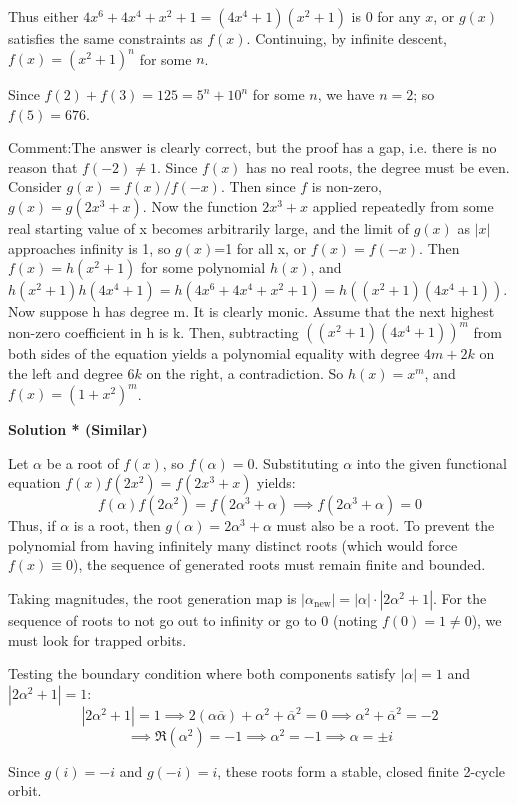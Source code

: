 \begin{enumerate}
 Thus either $4x^6+4x^4+x^2+1=(4x^4+1)(x^2+1)$ is 0 for any $x$, or $g(x)$ satisfies the same constraints as $f(x)$. Continuing, by infinite descent, $f(x) = (x^2 + 1)^n$ for some $n$.

 Since $f(2)+f(3)=125=5^n+10^n$ for some $n$, we have $n=2$; so $f(5) = \boxed{676}$.

 
Comment:The answer is clearly correct, but the proof has a gap, i.e. there is no reason that $f(-2)\neq1$.  Since $f(x)$ has no real roots, the degree must be even.  Consider $g(x)= f(x)/f(-x)$.  Then since $f$ is non-zero, $g(x)=g(2x^3+x)$. Now the function $2x^3+x$ applied repeatedly from some real starting value of x becomes arbitrarily large, and the limit of $g(x)$ as $|x|$ approaches infinity is 1, so $g(x)$=1 for all x, or $f(x)=f(-x)$.  Then $f(x)=h(x^2+1)$ for some polynomial $h(x)$, and $h(x^2+1)h(4x^4+1)=h(4x^6+4x^4+x^2+1) = h((x^2+1)(4x^4+1))$.  Now suppose h has degree m.  It is clearly monic.  Assume that the next highest non-zero coefficient in h is k.  Then, subtracting $((x^2+1)(4x^4+1))^m$ from both sides of the equation yields a polynomial equality with degree $4m+2k$ on the left and degree $6k$ on the right, a contradiction.  So $h(x)=x^m$, and $f(x)=(1+x^2)^m$.

 



\textbf{Solution * (Similar)}

Let $\alpha$ be a root of $f(x)$, so $f(\alpha) = 0$. Substituting $\alpha$ into the given functional equation $f(x)f(2x^2) = f(2x^3+x)$ yields:
 \[f(\alpha)f(2\alpha^2) = f(2\alpha^3+\alpha) \implies f(2\alpha^3+\alpha) = 0\]Thus, if $\alpha$ is a root, then $g(\alpha) = 2\alpha^3+\alpha$ must also be a root. To prevent the polynomial from having infinitely many distinct roots (which would force $f(x) \equiv 0$), the sequence of generated roots must remain finite and bounded.

 Taking magnitudes, the root generation map is $|\alpha_{\text{new}}| = |\alpha| \cdot |2\alpha^2 + 1|$. For the sequence of roots to not go out to infinity or go to $0$ (noting $f(0)=1 \neq 0$), we must look for trapped orbits. 

 Testing the boundary condition where both components satisfy $|\alpha| = 1$ and $|2\alpha^2 + 1| = 1$:
 \[|2\alpha^2+1|=1 \implies 2(\alpha\overline{\alpha})+\alpha^2+\overline{\alpha}^2=0 \implies \alpha^2+\overline{\alpha}^2=-2\] 
 \[\implies \Re (\alpha^2) = -1 \implies \alpha^2=-1 \implies \alpha = \pm i\]

 Since $g(i) = -i$ and $g(-i) = i$, these roots form a stable, closed finite 2-cycle orbit.


\end{enumerate}
